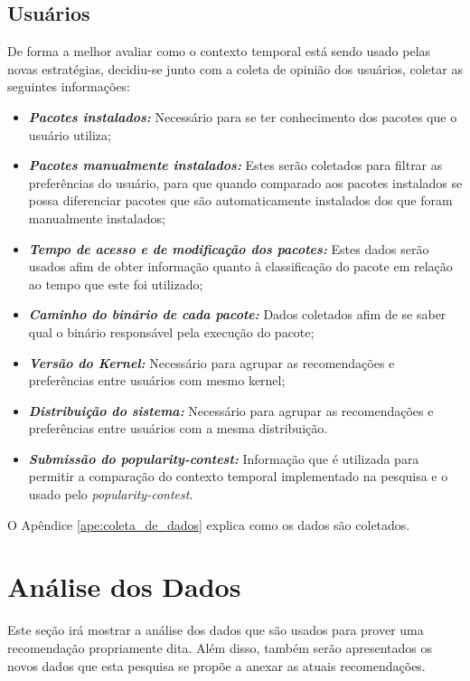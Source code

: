 \subsection{Usuários} \label{sec:coleta_dados_usuario}

De forma a melhor avaliar como o contexto temporal está sendo usado pelas novas
estratégias, decidiu-se junto com a coleta de opinião dos usuários, coletar
as seguintes informações:

\begin{itemize}
    \item \textit{\textbf{Pacotes instalados:}} Necessário para se ter conhecimento dos pacotes que o usuário utiliza;
    \item \textit{\textbf{Pacotes manualmente instalados:}} Estes serão coletados para filtrar as preferências do usuário, para que quando comparado aos pacotes instalados se possa diferenciar pacotes que são automaticamente instalados dos que foram manualmente instalados;
    \item \textit{\textbf{Tempo de acesso e de modificação dos pacotes:}} Estes dados serão usados afim de obter
        informação quanto à classificação do pacote em relação ao tempo que este foi utilizado;
    \item \textit{\textbf{Caminho do binário de cada pacote:}} Dados coletados afim de se saber qual o binário responsável pela execução do pacote;
    \item \textit{\textbf{Versão do Kernel:}} Necessário para agrupar as recomendações e preferências entre usuários com mesmo kernel;
    \item \textit{\textbf{Distribuição do sistema:}} Necessário para agrupar as recomendações e preferências entre usuários com a mesma distribuição.
    \item \textit{\textbf{Submissão do popularity-contest:}} Informação que é
        utilizada para permitir a comparação do contexto temporal implementado
        na pesquisa e o usado pelo \textit{popularity-contest}.
\end{itemize}

O Apêndice \ref{ape:coleta_de_dados} explica como os dados são coletados.

\section{Análise dos Dados}

Este seção irá mostrar a análise dos dados que são usados para prover uma
recomendação propriamente dita. Além disso, também serão apresentados os novos dados
que esta pesquisa se propõe a anexar as atuais recomendações.

